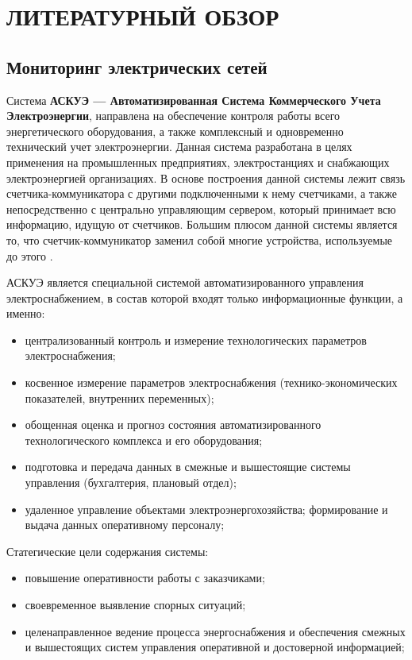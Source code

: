 \chapter{ЛИТЕРАТУРНЫЙ ОБЗОР}

\section{Мониторинг электрических сетей}

Система \textbf{АСКУЭ --- Автоматизированная Система Коммерческого Учета Электроэнергии}, направлена на обеспечение контроля работы всего энергетического оборудования, а также комплексный и одновременно технический учет электроэнергии. Данная система разработана в целях применения на промышленных предприятиях, электростанциях и снабжающих электроэнергией организациях. В основе построения данной системы лежит связь счетчика-коммуникатора с другими подключенными к нему счетчиками, а также непосредственно с центрально управляющим сервером, который принимает всю информацию, идущую от счетчиков. Большим плюсом данной системы является то, что счетчик-коммуникатор заменил собой многие устройства, используемые до этого \cite{ascaepinfo}.

АСКУЭ является специальной системой автоматизированного управления электроснабжением, в состав которой входят только информационные функции, а именно:
\begin{itemize}
\item централизованный контроль и измерение технологических параметров электроснабжения;
\item косвенное измерение параметров электроснабжения (технико-экономических показателей, внутренних переменных);
\item обощенная оценка и прогноз состояния автоматизированного технологического комплекса и его оборудования;
\item подготовка и передача данных в смежные и вышестоящие системы управления (бухгалтерия, плановый отдел);
\item удаленное управление объектами электроэнергохозяйства; формирование и выдача
данных оперативному персоналу;
\end{itemize}

Статегические цели содержания системы:
\begin{itemize}
\item повышение оперативности работы с заказчиками;
\item своевременное выявление спорных ситуаций;
\item целенаправленное ведение процесса энергоснабжения и обеспечения смежных и вышестоящих систем управления оперативной и достоверной информацией;
\end{itemize}


